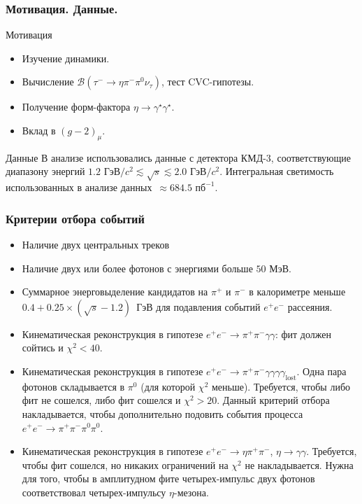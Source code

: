 \documentclass{beamer}
\begin{document}
\begin{frame}
  \frametitle{Мотивация. Данные.}
  \begin{block}{Мотивация}
  \begin{itemize}
  \item Изучение динамики.
  \item Вычисление $\mathcal{B}(\tau^-\to\eta\pi^-\pi^0\nu_{\tau})$, тест CVC-гипотезы.
  \item Получение форм-фактора $\eta\to\gamma^{\star}\gamma^{\star}$.
  \item Вклад в $(g-2)_{\mu}$.
  \end{itemize}
\end{block}
\begin{block}{Данные}
  В анализе использовались данные с детектора КМД-3, соответствующие диапазону
  энергий $1.2\text{ ГэВ}/c^2\lesssim\sqrt{s}\lesssim{2.0}\text{ ГэВ}/c^2$. Интегральная светимость
  использованных в анализе данных~$\approx{684.5}\text{ пб}^{-1}$.
\end{block}
\end{frame}

\begin{frame}
  \frametitle{Критерии отбора событий}
  \scriptsize
  \begin{itemize}
    \item Наличие двух центральных треков
    \item Наличие двух или более фотонов с энергиями больше $50\text{ МэВ}$.
    \item Суммарное энерговыделение кандидатов на $\pi^+$ и $\pi^-$ в калориметре меньше
      $0.4 + 0.25\times(\sqrt{s} - 1.2)$~ГэВ для подавления событий $e^+e^-$ рассеяния.
    \item Кинематическая реконструкция
      в гипотезе $e^+e^-\rightarrow\pi^+\pi^-\gamma\gamma$: фит должен сойтись
      и $\chi^2<40$.
    \item Кинематическая реконструкция в гипотезе $e^+e^-\rightarrow\pi^+\pi^-\gamma\gamma\gamma\gamma_{\text{lost}}$. Одна
      пара фотонов складывается в $\pi^0$ (для которой $\chi^2$ меньше). Требуется, чтобы
      либо фит не сошелся, либо фит сошелся и $\chi^2>20$. Данный критерий отбора
      накладывается, чтобы дополнительно подовить события процесса $e^+e^-\to\pi^+\pi^-\pi^0\pi^0$.
    \item Кинематическая реконструкция в гипотезе $e^+e^-\rightarrow\eta\pi^+\pi^-$, $\eta\rightarrow\gamma\gamma$. Требуется,
      чтобы фит сошелся, но никаких ограничений на $\chi^2$ не накладывается. Нужна
      для того, чтобы в амплитудном фите четырех-импульс двух фотонов
      соответствовал четырех-импульсу $\eta$-мезона.
    \end{itemize}
  \end{frame}
\end{document}
